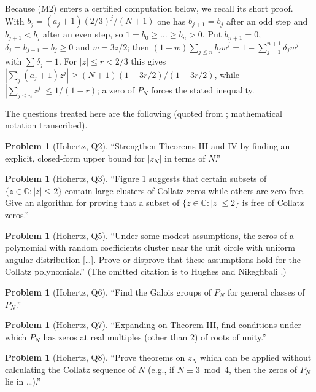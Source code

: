 \documentclass[11pt,a4paper]{article}
\theoremstyle{definition}
\newtheorem{problem}[theorem]{Problem}
\theoremstyle{remark}
\numberwithin{equation}{section}
\begin{document}
Because (M2) enters a certified computation below, we recall its short proof.
With $b_j=(a_j+1)(2/3)^j/(N+1)$ one has $b_{j+1}=b_j$ after an odd step and
$b_{j+1}<b_j$ after an even step, so $1=b_0\ge\dots\ge b_n>0$.  Put $b_{n+1}=0$,
$\delta_j=b_{j-1}-b_j\ge0$ and $w=3z/2$; then
$(1-w)\sum_{j\le n}b_jw^j=1-\sum_{j=1}^{n+1}\delta_jw^j$ with $\sum\delta_j=1$.
For $|z|\le r<2/3$ this gives
$|\sum_j(a_j+1)z^j|\ge(N+1)(1-3r/2)/(1+3r/2)$, while
$|\sum_{j\le n}z^j|\le 1/(1-r)$; a zero of $P_N$ forces the stated inequality.

The questions treated here are the following (quoted from \cite[Section~5]{R005};
mathematical notation transcribed).

\begin{problem}[Hohertz, Q2]\label{B:C:prob-Q2}
``Strengthen Theorems III and IV by finding an explicit, closed-form upper bound
for $|z_N|$ in terms of $N$.''
\end{problem}

\begin{problem}[Hohertz, Q3]\label{B:C:prob-Q3}
``Figure 1 suggests that certain subsets of $\{z\in\mathbb C:|z|\le2\}$ contain
large clusters of Collatz zeros while others are zero-free. Give an algorithm for
proving that a subset of $\{z\in\mathbb C:|z|\le2\}$ is free of Collatz zeros.''
\end{problem}

\begin{problem}[Hohertz, Q5]\label{B:C:prob-Q5}
``Under some modest assumptions, the zeros of a polynomial with random
coefficients cluster near the unit circle with uniform angular distribution
[\dots]. Prove or disprove that these assumptions hold for
the Collatz polynomials.''  (The omitted citation is to Hughes and Nikeghbali \cite{R026}.)
\end{problem}

\begin{problem}[Hohertz, Q6]\label{B:C:prob-Q6}
``Find the Galois groups of $P_N$ for general classes of $P_N$.''
\end{problem}

\begin{problem}[Hohertz, Q7]\label{B:C:prob-Q7}
``Expanding on Theorem III, find conditions under which $P_N$ has zeros at real
multiples (other than 2) of roots of unity.''
\end{problem}

\begin{problem}[Hohertz, Q8]\label{B:C:prob-Q8}
``Prove theorems on $z_N$ which can be applied without calculating the Collatz
sequence of $N$ (e.g., if $N\equiv3\bmod4$, then the zeros of $P_N$ lie in
\dots).''
\end{problem}
\end{document}
